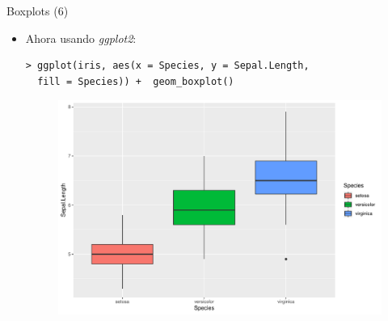 \documentclass[handout]{beamer}
\begin{document}
\begin{frame}[fragile]{Boxplots (6)}
\scriptsize{
\begin{itemize}

\item Ahora usando \emph{ggplot2}:
\begin{verbatim}
> ggplot(iris, aes(x = Species, y = Sepal.Length, 
  fill = Species)) +  geom_boxplot()
\end{verbatim}

 \begin{figure}[h!]
	\centering
	\includegraphics[scale=0.4]{pics/boxplotggplot2.pdf}		
\end{figure} 
 
\end{itemize}

}
\end{frame}
\end{document}
